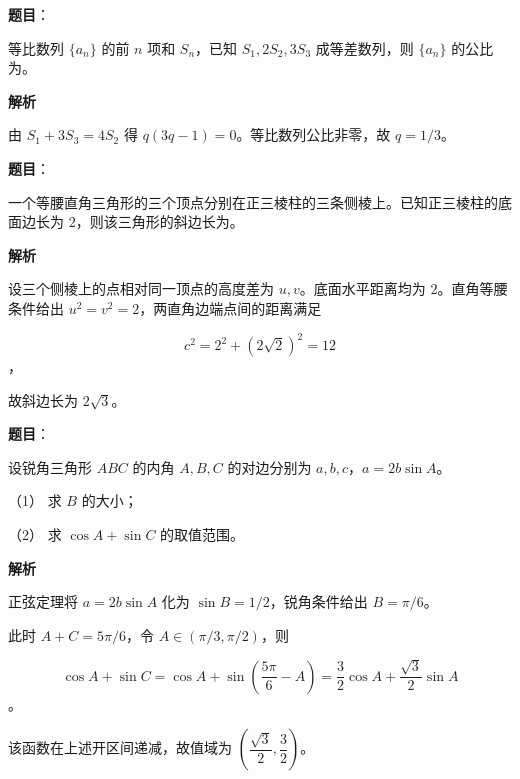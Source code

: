 \begin{answer}

\textbf{题目}：

等比数列 $\{a_n\}$ 的前 $n$ 项和 $S_n$，已知 $S_1,2S_2,3S_3$ 成等差数列，则 $\{a_n\}$ 的公比为\gkblank{}。

\textbf{解析}

由 $S_1+3S_3=4S_2$ 得 $q(3q-1)=0$。等比数列公比非零，故 $q=1/3$。


\end{answer}
\begin{answer}

\textbf{题目}：

一个等腰直角三角形的三个顶点分别在正三棱柱的三条侧棱上。已知正三棱柱的底面边长为 $2$，则该三角形的斜边长为\gkblank{}。

\textbf{解析}

设三个侧棱上的点相对同一顶点的高度差为 $u,v$。底面水平距离均为 $2$。直角等腰条件给出 $u^2=v^2=2$，两直角边端点间的距离满足

\nopagebreak[4]
\[
c^2=2^2+(2\sqrt2)^2=12
\]
，

故斜边长为 $2\sqrt3$。


\end{answer}
\begin{answer}

\textbf{题目}：

设锐角三角形 $ABC$ 的内角 $A,B,C$ 的对边分别为 $a,b,c$，$a=2b\sin A$。

（1） 求 $B$ 的大小；

（2） 求 $\cos A+\sin C$ 的取值范围。

\textbf{解析}


正弦定理将 $a=2b\sin A$ 化为 $\sin B=1/2$，锐角条件给出 $B=\pi/6$。


此时 $A+C=5\pi/6$，令 $A\in(\pi/3,\pi/2)$，则

\nopagebreak[4]
\[
\cos A+\sin C
=\cos A+\sin\left(\frac{5\pi}{6}-A\right)
=\frac32\cos A+\frac{\sqrt3}{2}\sin A
\]
。

该函数在上述开区间递减，故值域为 $\left(\dfrac{\sqrt3}{2},\dfrac32\right)$。



\end{answer}
